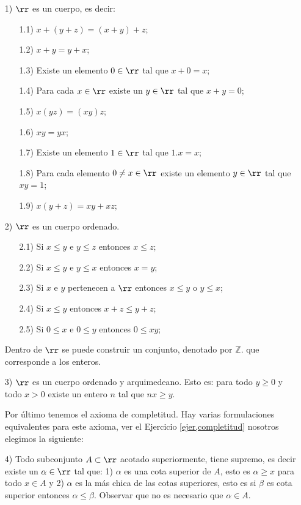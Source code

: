   \begin{itemize}
    \item[1)] $\rr$ es un cuerpo, es decir:
        \begin{itemize}
            \item[1.1)] $x+(y+z)=(x+y)+z$;
            \item[1.2)] $x+y=y+x$;
            \item[1.3)] Existe un elemento $0\in\rr$ tal que $x+0=x$;
            \item[1.4)] Para cada $x\in\rr$ existe un $y\in\rr$
            tal que $x+y=0$;
            \item[1.5)] $x(yz)=(xy)z$;
            \item[1.6)] $xy=yx$;
            \item[1.7)] Existe un elemento $1\in\rr$ tal que
            $1.x=x$;
            \item[1.8)] Para cada elemento $0\neq x\in\rr$ existe un
            elemento $y\in\rr$ tal que $xy=1$;
            \item[1.9)] $x(y+z)=xy+xz$;
        \end{itemize}
    \item[2)] $\rr$ es un cuerpo ordenado.
        \begin{itemize}
            \item[2.1)] Si $x\leq y$ e $y\leq z$ entonces $x\leq
            z$;
            \item[2.2)] Si $x\leq y$ e $y\leq x$ entonces $x=y$;
            \item[2.3)] Si $x$ e $y$ pertenecen a $\rr$ entonces
            $x\leq y$ o $y\leq x$;
            \item[2.4)] Si $x\leq y$ entonces $x+z\leq y+z$;
            \item[2.5)] Si $0\leq x$ e $0\leq y$ entonces $0\leq
            xy$;
        \end{itemize}

        Dentro de $\rr$  se puede construir un conjunto, denotado
        por $\mathbb{Z}$. que corresponde a los enteros.
    \item[3)] $\rr$ es un cuerpo ordenado y arquimedeano. Esto es:
    para todo $y\geq 0$ y todo $x>0$ existe un entero $n$ tal que
    $nx\geq y$.

    Por último tenemos el axioma de completitud. Hay varias
    formulaciones equivalentes para este axioma, ver el Ejercicio
     \vref{ejer,completitud} nosotros elegimos
    la siguiente:

    \item[4)] Todo subconjunto $A\subset\rr$ acotado
    superiormente, tiene supremo, es decir existe un $\alpha\in\rr$
    tal que: 1) $\alpha$ es una cota superior de $A$, esto es $\alpha\geq x$
    para todo $x\in A$ y 2) $\alpha$ es la más chica de las
    cotas superiores, esto es si $\beta$ es cota superior entonces
    $\alpha\leq\beta$. Observar que no es necesario que $\alpha\in
    A$.
  \end{itemize}



